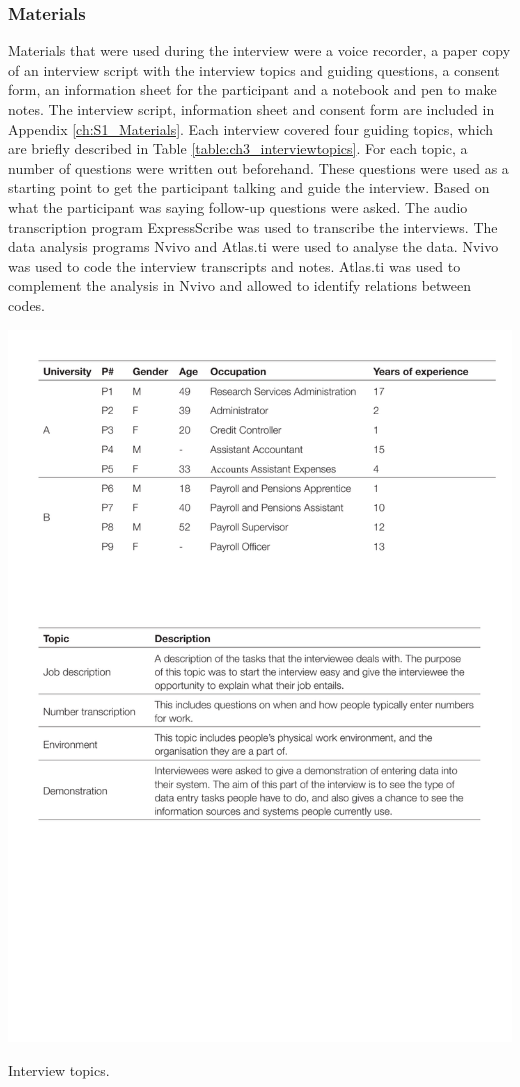 \subsubsection{Materials}
Materials that were used during the interview were a voice recorder, a paper copy of an interview script with the interview topics and guiding questions, a consent form, an information sheet for the participant and a notebook and pen to make notes. The interview script, information sheet and consent form are included in Appendix \ref{ch:S1_Materials}.
Each interview covered four guiding topics, which are briefly described in Table \ref{table:ch3_interviewtopics}. For each topic, a number of questions were written out beforehand. These questions were used as a starting point to get the participant talking and guide the interview. Based on what the participant was saying follow-up questions were asked. The audio transcription program ExpressScribe was used to transcribe the interviews. The data analysis programs Nvivo and Atlas.ti were used to analyse the data. Nvivo was used to code the interview transcripts and notes. Atlas.ti was used to complement the analysis in Nvivo and allowed to identify relations between codes.

\begin{table}[htp]
\centering
\includegraphics[width=\textwidth]{images/ch12/ch12-1_InterviewTopics.pdf}
    \caption[Study 1 interview topics]{Interview topics.}
    \label{table:ch3_interviewtopics}
\end{table}%

